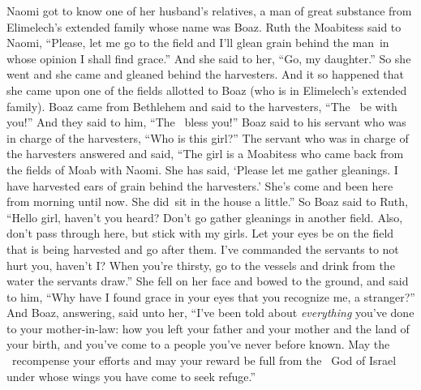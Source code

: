 
\begin{inparaenum}
   Naomi got to know one of her husband's relatives, a man of great substance from Elimelech's extended family whose name was Boaz.%
   Ruth the Moabitess said to Naomi, ``Please, let me go to the field and I'll glean grain behind the man\understood{}\ in whose opinion I shall find grace.'' And she said to her, ``Go, my daughter.''%
   So she went and she came and gleaned behind the harvesters. And it so happened that she came upon one of the fields allotted to Boaz (who is in Elimelech's extended family).%
   Boaz came from Bethlehem and said to the harvesters, ``The \lord\ be with you!'' And they said to him, ``The \lord\ bless you!''%
   Boaz said to his servant who was in charge of the harvesters, ``Who is this girl?''%
   The servant who was in charge of the harvesters answered and said, ``The girl is a Moabitess who came back from the fields of Moab with Naomi.%
   She has said, `Please let me gather gleanings. I have harvested ears of grain behind the harvesters.' She's come and been here from morning until now. She did\understood{}\ sit in the house a little.''%
   So Boaz said to Ruth, ``Hello girl, haven't you heard? Don't go gather gleanings in another field. Also, don't pass through here, but stick with my girls.%
   Let your eyes be on the field that is being harvested and go after them. I've commanded the servants to not hurt you, haven't I? When you're thirsty, go to the vessels and drink from the water\understood{} the servants draw.''%
   She fell on her face and bowed to the ground, and said to him, ``Why have I found grace in your eyes that you recognize me, a stranger?''%
   And Boaz, answering, said unto her, ``I've been told about \emph{everything} you've done to your mother-in-law: how you left your father and your mother and the land of your birth, and you've come to a people you've never before known.%
   May the \lord\ recompense your efforts and may your reward be full from the \lord\ God of Israel under whose wings you have come to seek refuge.''%

\end{inparaenum}
